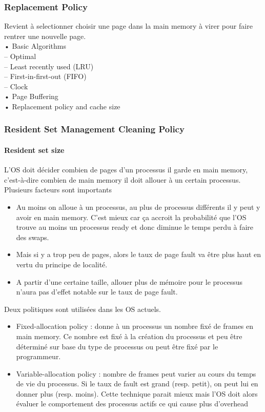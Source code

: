 \subsubsection{Replacement Policy}
Revient à selectionner choisir une page dans la main memory à virer pour faire rentrer une nouvelle page.\\
• Basic Algorithms\\
– Optimal\\
– Least recently used (LRU)\\
– First-in-first-out (FIFO) \\
– Clock\\
• Page Buffering\\
• Replacement policy and cache size
\subsubsection{Resident Set Management Cleaning Policy}
\paragraph{Resident set size} L'OS doit décider combien de pages d'un processus il garde en main memory, c'est-à-dire combien de main memory il doit allouer à un certain processus.
Plusieurs facteurs sont importants
\begin{itemize}
\item Au moins on alloue à un processus, au plus de processus différents il y peut y avoir en main memory.
C'est mieux car ça accroit la probabilité que l'OS trouve au moins un processus ready et donc diminue le temps perdu à faire des swaps.
\item Mais si y a trop peu de pages, alors le taux de page fault va être plus haut en vertu du principe de localité.
\item A partir d'une certaine taille, allouer plus de mémoire pour le processus n'aura pas d'effet notable sur le taux de page fault.
\end{itemize}
Deux politiques sont utilisées dans les OS actuels.
\begin{itemize}
\item Fixed-allocation policy : donne à un processus un nombre fixé de frames en main memory.
Ce nombre est fixé à la création du processus et peu être déterminé sur base du type de processus ou peut être fixé par le programmeur.
\item Variable-allocation policy : nombre de frames peut varier au cours du temps de vie du processus.
Si le taux de fault est grand (resp.
petit), on peut lui en donner plus (resp.
moins).
Cette technique parait mieux mais l'OS doit alors évaluer le comportement des processus actifs ce qui cause plus d'overhead
\end{itemize}
